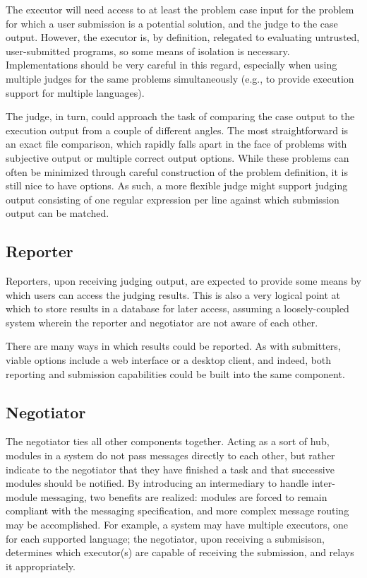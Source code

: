 \documentclass[11pt,letterpaper]{article}
\begin{document}
The executor will need access to at least the problem case input for the
problem for which a user submission is a potential solution, and the judge to
the case output. However, the executor is, by definition, relegated to
evaluating untrusted, user-submitted programs, so some means of isolation is
necessary. Implementations should be very careful in this regard, especially
when using multiple judges for the same problems simultaneously (e.g., to
provide execution support for multiple languages).

The judge, in turn, could approach the task of comparing the case output to the
execution output from a couple of different angles. The most straightforward is
an exact file comparison, which rapidly falls apart in the face of problems
with subjective output or multiple correct output options. While these problems
can often be minimized through careful construction of the problem definition,
it is still nice to have options. As such, a more flexible judge might support
judging output consisting of one regular expression per line against which
submission output can be matched.

\subsection{Reporter}
\label{design-reporter}

Reporters, upon receiving judging output, are expected to provide some means by
which users can access the judging results. This is also a very logical point
at which to store results in a database for later access, assuming a
loosely-coupled system wherein the reporter and negotiator are not aware of
each other.

There are many ways in which results could be reported. As with submitters,
viable options include a web interface or a desktop client, and indeed, both
reporting and submission capabilities could be built into the same component.

\subsection{Negotiator}
\label{design-hub}

The negotiator ties all other components together. Acting as a sort of hub,
modules in a system do not pass messages directly to each other, but rather
indicate to the negotiator that they have finished a task and that successive
modules should be notified. By introducing an intermediary to handle
inter-module messaging, two benefits are realized: modules are forced to remain
compliant with the messaging specification, and more complex message routing
may be accomplished. For example, a system may have multiple executors, one for
each supported language; the negotiator, upon receiving a submisison,
determines which executor(s) are capable of receiving the submission, and
relays it appropriately.
\end{document}
